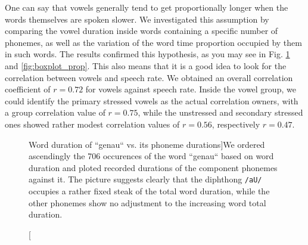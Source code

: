 \documentclass[11pt,a4paper]{scrbook}
\begin{document}
One can say that vowels generally tend to get proportionally longer when the words themselves are spoken slower. We investigated this assumption by comparing the vowel duration inside words containing a specific number of phonemes, as well as the variation of the word time proportion occupied by them in such words. The results confirmed this hypothesis, as you may see in Fig. \ref{fig:w_dur_vs_pho} and \ref{fig:boxplot_prop}. This also means that it is a good idea to look for the correlation between vowels and speech rate. We obtained an overall correlation coefficient of $r = 0.72$ for vowels against speech rate. Inside the vowel group, we could identify the primary stressed vowels as the actual correlation owners, with a group correlation value of $r = 0.75$, while the unstressed and secondary stressed ones showed rather modest correlation values of $r = 0.56$, respectively $r = 0.47$. 

\begin{figure}[htbp]
	\noindent{}
	\centering
	\vspace{-10mm}
	\caption[Word duration of ``genau`` vs. its phoneme durations]{We ordered ascendingly the 706 occurences of the word ``genau`` based on word duration and ploted recorded durations of the component phonemes against it. The picture suggests clearly that the diphthong \texttt{/aU/} occupies a rather fixed steak of the total word duration, while the other phonemes show no adjustment to the increasing word total duration. }
	\label{fig:w_dur_vs_pho}
\end{figure}
\end{document}
